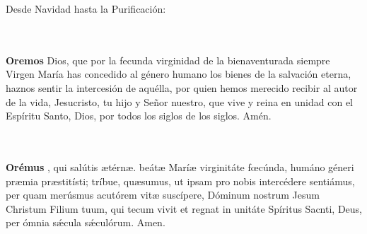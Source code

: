 \documentclass[10pt,a4paper,oneside]{book}
\begin{document}
\noindent\small{Desde Navidad hasta la Purificación:}\\
\begin{minipage}[t]{0.475\textwidth}
      \\\\
      \textbf{Oremos}
       Dios, que por la fecunda virginidad de la bienaventurada siempre Virgen María has concedido al género humano los bienes de la salvación eterna, haznos sentir
      la intercesión de aquélla, por quien hemos merecido recibir al autor de la vida, Jesucristo, tu hijo y Señor nuestro, que vive y reina en unidad con el Espíritu Santo, Dios, por
      todos los siglos de los siglos. Amén.
\end{minipage}
\begin{minipage}[t]{0.475\textwidth}
      \\\\
      \textbf{Orémus}
      , qui salútis {\ae}térn{\ae}. beát{\ae} Marí{\ae} virginitáte f{\oe}cúnda, humáno géneri pr{\ae}mia pr{\ae}stitísti; tríbue, qu{\ae}sumus, ut ipsam pro nobis
      intercédere sentiámus, per quam merúsmus acutórem vit{\ae} suscípere, Dóminum nostrum Jesum Christum Filium tuum, qui tecum vivit et regnat in unitáte Spíritus Sacnti, Deus, per ómnia
      s{\'\ae}cula s{\'\ae}culórum. Amen.
\end{minipage}

\bigskip
\end{document}
